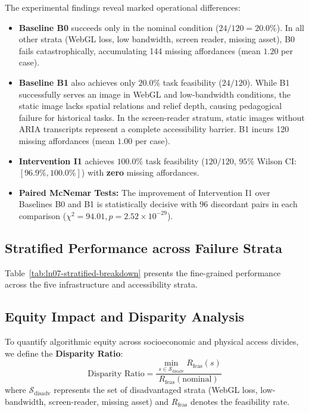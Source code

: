 \documentclass[11pt,a4paper]{article}
\begin{document}
The experimental findings reveal marked operational differences:
\begin{itemize}
    \item \textbf{Baseline B0} succeeds only in the nominal condition ($24/120 = 20.0\%$). In all other strata (WebGL loss, low bandwidth, screen reader, missing asset), B0 fails catastrophically, accumulating 144 missing affordances (mean $1.20$ per case).
    \item \textbf{Baseline B1} also achieves only $20.0\%$ task feasibility ($24/120$). While B1 successfully serves an image in WebGL and low-bandwidth conditions, the static image lacks spatial relations and relief depth, causing pedagogical failure for historical tasks. In the screen-reader stratum, static images without ARIA transcripts represent a complete accessibility barrier. B1 incurs 120 missing affordances (mean $1.00$ per case).
    \item \textbf{Intervention I1} achieves $100.0\%$ task feasibility ($120/120$, $95\%$ Wilson CI: $[96.9\%, 100.0\%]$) with \textbf{zero} missing affordances.
    \item \textbf{Paired McNemar Tests:} The improvement of Intervention I1 over Baselines B0 and B1 is statistically decisive with 96 discordant pairs in each comparison ($\chi^2 = 94.01, p = 2.52 \times 10^{-29}$).
\end{itemize}

\subsection{Stratified Performance across Failure Strata}
Table~\ref{tab:ln07-stratified-breakdown} presents the fine-grained performance across the five infrastructure and accessibility strata.



\subsection{Equity Impact and Disparity Analysis}
To quantify algorithmic equity across socioeconomic and physical access divides, we define the \textbf{Disparity Ratio}:
\begin{equation}
    \text{Disparity Ratio} = \frac{\min_{s \in \mathcal{S}_{\text{disadv}}} R_{\text{feas}}(s)}{R_{\text{feas}}(\text{nominal})}
\end{equation}
where $\mathcal{S}_{\text{disadv}}$ represents the set of disadvantaged strata (WebGL loss, low-bandwidth, screen-reader, missing asset) and $R_{\text{feas}}$ denotes the feasibility rate.
\end{document}
